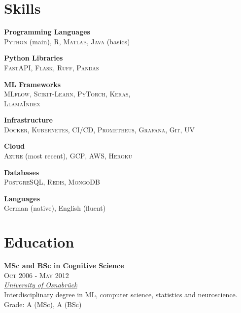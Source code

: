 \documentclass[a4paper,9.5pt]{article}
\begin{document}
\vspace{3mm}
\noindent
\begin{minipage}[t]{0.32\textwidth}

\section{Skills}
\small

\vspace{1.5mm}
\textbf{Programming Languages}\\
\textsc{Python} (main), \textsc{R}, \textsc{Matlab}, \textsc{Java} (basics)
\vspace{1.5mm}

\textbf{Python Libraries}\\
\textsc{FastAPI}, \textsc{Flask}, \textsc{Ruff}, \textsc{Pandas}
\vspace{1.5mm}

\textbf{ML Frameworks}\\
\textsc{MLflow}, \textsc{Scikit-Learn}, \textsc{PyTorch}, \textsc{Keras}, \\ \textsc{LlamaIndex}
\vspace{1.5mm}

\textbf{Infrastructure}\\
\textsc{Docker}, \textsc{Kubernetes}, \textsc{CI/CD}, \textsc{Prometheus}, \textsc{Grafana}, \textsc{Git}, \textsc{UV}
\vspace{1.5mm}

\textbf{Cloud}\\
\textsc{Azure} (most recent), \textsc{GCP}, \textsc{AWS}, \textsc{Heroku}
\vspace{1.5mm}

\textbf{Databases}\\
\textsc{PostgreSQL}, \textsc{Redis}, \textsc{MongoDB}
\vspace{1.5mm}

\textbf{Languages}\\
German (native), English (fluent)
\vspace{3mm}

\section{Education}
\small
\vspace{1.5mm}
\textbf{MSc and BSc in Cognitive Science}\\
\textsc{Oct 2006 - May 2012}\\
\textit{\href{https://www.ikw.uni-osnabrueck.de/en}{University of Osnabrück}}\\
Interdisciplinary degree in ML, computer science, statistics and neuroscience.\\
Grade: A (MSc), A (BSc)
\vspace{3mm}


\end{minipage}
\end{document}
